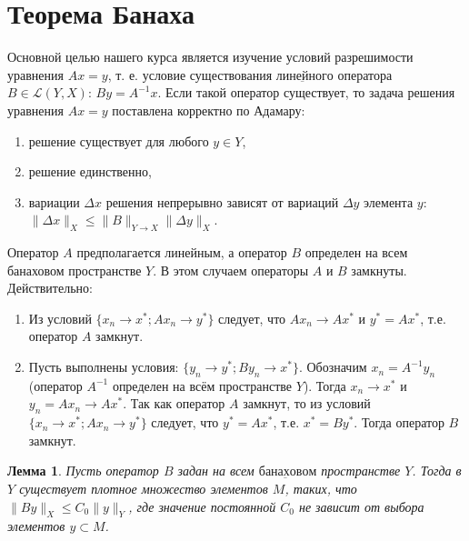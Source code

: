\documentclass[12pt,a4paper,titlepage,oneside]{book}
\theoremstyle{definition}
\theoremstyle{plain}
\theoremstyle{remark}
\theoremstyle{remark}
\theoremstyle{remark}
\theoremstyle{remark}
\theoremstyle{plain}
\newtheorem*{lemma}{Лемма}
\theoremstyle{plain}
\begin{document}
\section{Теорема Банаха}
Основной целью нашего курса является изучение условий разрешимости уравнения $Ax=y$, т. е. условие существования $\underbar {линейного}$ оператора $B\in \mathcal{L}(Y, X)$: $By=A^{-1}x$. Если такой оператор существует, то задача решения уравнения $Ax=y$ поставлена корректно по Адамару:
\begin{enumerate}
	\item решение существует для любого $y \in Y$,
	\item решение единственно,
	\item вариации $\Delta x$ решения непрерывно зависят от вариаций $\Delta y$ элемента $y$: $\lVert \Delta x\rVert_X \leqslant \lVert B\rVert_{Y\to X}\lVert \Delta y\rVert_X$.
\end{enumerate}
Оператор $A$ предполагается линейным, а оператор $B$ определен на всем банаховом пространстве $Y$. В этом случаем операторы $A$ и $B$ замкнуты. Действительно:
\begin{enumerate}

	\item Из условий $\{x_n \to x^{*};Ax_n \to y^{*}\}$ следует, что $Ax_n \to Ax^{*}$ и $y^{*}=Ax^{*}$, т.е. оператор $A$ замкнут.

	\item Пусть выполнены условия: $\{y_n \to y^{*}; By_n \to x^{*}\}$. Обозначим $x_n=A^{-1}y_n$ (оператор $A^{-1}$ определен на всём пространстве $Y$). Тогда $x_n \to x^{*}$ и $y_n=Ax_n \to Ax^{*}$. Так как оператор $A$ замкнут, то из условий $\{x_n \to x^{*};Ax_n \to y^{*}\}$ следует, что $y^{*}=Ax^{*}$, т.е. $x^{*}=By^{*}$. Тогда оператор $B$ замкнут.
	
\end{enumerate}
	
\begin{lemma}
Пусть оператор $B$ задан на всем $\underbar {банаховом}$ пространстве $Y$. Тогда в $Y$ существует плотное множество элементов $M$, таких, что $\lVert By\rVert_X \leqslant C_0\lVert y\rVert_Y $, где значение постоянной $C_0$ не зависит от выбора элементов $y \subset M$.
\end{lemma}
\end{document}
